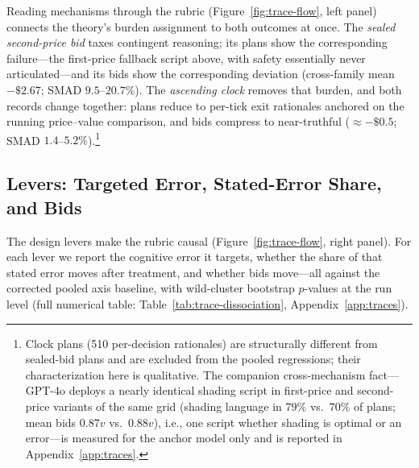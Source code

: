 Reading mechanisms through the rubric (Figure~\ref{fig:trace-flow}, left panel) connects the theory's burden assignment to both outcomes at once. The \emph{sealed second-price bid} taxes contingent reasoning; its plans show the corresponding failure---the first-price fallback script above, with safety essentially never articulated---and its bids show the corresponding deviation (cross-family mean $-\$2.67$; SMAD $9.5$--$20.7\%$). The \emph{ascending clock} removes that burden, and both records change together: plans reduce to per-tick exit rationales anchored on the running price--value comparison, and bids compress to near-truthful ($\approx -\$0.5$; SMAD $1.4$--$5.2\%$).\footnote{Clock plans (510 per-decision rationales) are structurally different from sealed-bid plans and are excluded from the pooled regressions; their characterization here is qualitative.  The companion cross-mechanism fact---GPT-4o deploys a nearly identical shading script in first-price and second-price variants of the same grid (shading language in $79\%$ vs.\ $70\%$ of plans; mean bids $0.87v$ vs.\ $0.88v$), i.e., one script whether shading is optimal or an error---is measured for the anchor model only and is reported in Appendix~\ref{app:traces}.}

\subsection{Levers: Targeted Error, Stated-Error Share, and Bids}\label{sec:traces-levers}

The design levers make the rubric causal (Figure~\ref{fig:trace-flow}, right panel). For each lever we report the cognitive error it targets, whether the share of that stated error moves after treatment, and whether bids move---all against the corrected pooled axis baseline, with wild-cluster bootstrap $p$-values at the run level (full numerical table: Table~\ref{tab:trace-dissociation}, Appendix~\ref{app:traces}).

